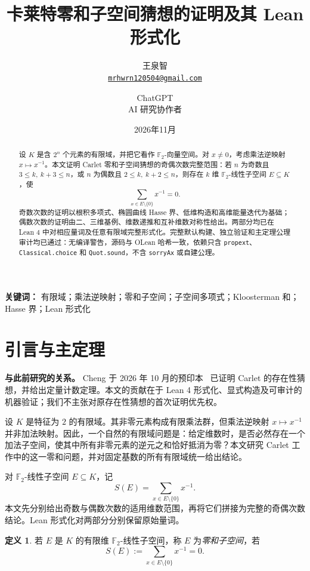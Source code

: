 \documentclass[UTF8,a4paper,11pt]{ctexart}
\title{卡莱特零和子空间猜想的证明及其 Lean 形式化}
\author{王泉智\\[-.3em]\small\href{mailto:mrhwrn120504@gmail.com}{\texttt{mrhwrn120504@gmail.com}}\and ChatGPT\\[-.3em]\small AI 研究协作者}
\date{2026年11月}
\numberwithin{equation}{section}
\theoremstyle{definition}
\newtheorem{definition}[theorem]{定义}
\theoremstyle{remark}
\newcommand{\Ftwo}{\mathbb F_2}
\begin{document}
\maketitle

\begin{abstract}
设 $K$ 是含 $2^n$ 个元素的有限域，并把它看作 $\Ftwo$-向量空间。对 $x\ne0$，考虑乘法逆映射 $x\mapsto x^{-1}$。本文证明 Carlet 零和子空间猜想的奇偶次数完整范围：若 $n$ 为奇数且 $3\le k,\ k+3\le n$，或 $n$ 为偶数且 $2\le k,\ k+2\le n$，则存在 $k$ 维 $\Ftwo$-线性子空间 $E\subseteq K$，使
\[
  \sum_{x\in E\setminus\{0\}}x^{-1}=0.
\]
奇数次数的证明以根积多项式、椭圆曲线 Hasse 界、低维构造和高维能量迭代为基础；偶数次数的证明由二、三维基例、维数递推和互补维数对称性给出。两部分均已在 Lean 4 中对相应量词及任意有限域完整形式化。完整默认构建、独立验证和主定理公理审计均已通过：无编译警告，源码与 OLean 哈希一致，依赖只含 \texttt{propext}、\texttt{Classical.choice} 和 \texttt{Quot.sound}，不含 \texttt{sorryAx} 或自建公理。
\end{abstract}

\noindent\textbf{关键词：} 有限域；乘法逆映射；零和子空间；子空间多项式；Kloosterman 和；Hasse 界；Lean 形式化

\section{引言与主定理}

\noindent\textbf{与此前研究的关系。} Cheng 于 2026 年 10 月的预印本~\cite{Cheng2026} 已证明 Carlet 的存在性猜想，并给出定量计数定理。本文的贡献在于 Lean 4 形式化、显式构造及可审计的机器验证；我们不主张对原存在性猜想的首次证明优先权。


设 $K$ 是特征为 $2$ 的有限域。其非零元素构成有限乘法群，但乘法逆映射 $x\mapsto x^{-1}$ 并非加法映射。因此，一个自然的有限域问题是：给定维数时，是否必然存在一个加法子空间，使其中所有非零元素的逆元之和恰好抵消为零？本文研究 Carlet 工作中的这一零和问题\cite{Carlet2025}，并对固定基数的所有有限域统一给出结论。

对 $\Ftwo$-线性子空间 $E\subseteq K$，记
\[
 S(E)=\sum_{x\in E\setminus\{0\}}x^{-1}.
\]
本文先分别给出奇数与偶数次数的适用维数范围，再将它们拼接为完整的奇偶次数结论。Lean 形式化对两部分分别保留原始量词。

\begin{definition}
若 $E$ 是 $K$ 的有限维 $\Ftwo$-线性子空间，称 $E$ 为\emph{零和子空间}，若
\[
  S(E):=\sum_{x\in E\setminus\{0\}}x^{-1}=0.
\]
\end{definition}
\end{document}
